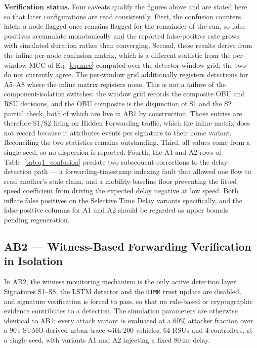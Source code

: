 \documentclass[12pt, a4paper]{report}
\begin{document}
{{\textbf{Verification status.} Four caveats qualify the figures
above and are stated here so that later configurations are read
consistently. First, the confusion counters latch: a node
flagged once remains flagged for the remainder of the run, so
false positives accumulate monotonically and the reported
false-positive rate grows with simulated duration rather than
converging. Second, these results derive from the inline
per-node confusion matrix, which is a different statistic from
the per-window \ac{MCC} of Eq.~\ref{eq:mcc} computed over the
detector window grid; the two do not currently agree. The
per-window grid additionally registers detections for A5--A8
where the inline matrix registers none. This is not a failure of
the component-isolation switches: the window grid records the
composite \ac{OBU} and \ac{RSU} decisions, and the \ac{OBU}
composite is the disjunction of S1 and the S2 partial check,
both of which are live in AB1 by construction. Those entries are
therefore S1/S2 firing on Hidden Forwarding traffic, which the
inline matrix does not record because it attributes events per
signature to their home variant. Reconciling the two statistics
remains outstanding. Third, all values come from a single seed,
so no dispersion is reported. Fourth, the A1 and A2 rows of
Table~\ref{tab:q1_confusion} predate two subsequent corrections
to the delay-detection path --- a forwarding-timestamp indexing
fault that allowed one flow to read another's stale claim, and a
mobility-baseline floor preventing the fitted speed coefficient
from driving the expected delay negative at low speed. Both
inflate false positives on the Selective Time Delay variants
specifically, and the false-positive columns for A1 and A2
should be regarded as upper bounds pending regeneration.


\subsection{AB2 --- Witness-Based Forwarding Verification in
Isolation}
\label{sec:q4_results}

In AB2, the witness monitoring mechanism is the only active
detection layer. Signatures S1--S8, the \ac{LSTM} detector and
the \texttt{BTMM} trust update are disabled, and signature
verification is forced to pass, so that no rule-based or
cryptographic evidence contributes to a detection. The
simulation parameters are otherwise identical to AB1: every
attack variant is evaluated at a 60\% attacker fraction over a
90\,s \ac{SUMO}-derived urban trace with 200 vehicles, 64
\ac{RSU}s and 4 controllers, at a single seed, with variants A1
and A2 injecting a fixed 80\,ms delay.

}}
\end{document}
